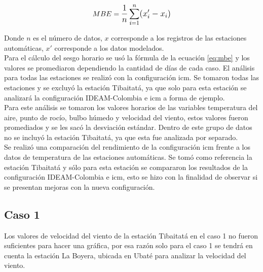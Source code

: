 \begin{equation}\label{eq:mbe}
MBE = \mathlarger{\frac{1}{n} \sum_{i=1}^n (x'_i - x_i)}
\end{equation}

Donde $n$ es el número de datos, $x$ corresponde a los registros de las estaciones automáticas, $x'$ corresponde a los datos modelados.\\

Para el cálculo del sesgo horario se usó la fórmula de la ecuación \ref{eq:mbe} y los valores se promediaron dependiendo la cantidad de días de cada caso. El análisis para todas las estaciones se realizó con la configuración icm. Se tomaron todas las estaciones y se excluyó la estación Tibaitatá, ya que solo para esta estación se analizará la configuración IDEAM-Colombia e icm a forma de ejemplo.\\

Para este análisis se tomaron los valores horarios de las variables temperatura del aire, punto de rocío, bulbo húmedo y velocidad del viento, estos valores fueron promediados y se les sacó la desviación estándar. Dentro de este grupo de datos no se incluyó la estación Tibaitatá, ya que esta fue analizada por separado.\\

Se realizó una comparación del rendimiento de la configuración icm frente a los datos de temperatura de las estaciones automáticas. Se tomó como referencia la estación Tibaitatá y sólo para esta estación se compararon los resultados de la configuración IDEAM-Colombia e icm, esto se hizo con la finalidad de observar si se presentan mejoras con la nueva configuración.\\

\subsection{Caso 1}

Los valores de velocidad del viento de la estación Tibaitatá en el caso 1 no fueron suficientes para hacer una gráfica, por esa razón solo para el caso 1 se tendrá en cuenta la estación La Boyera, ubicada en Ubaté para analizar la velocidad del viento.
	
